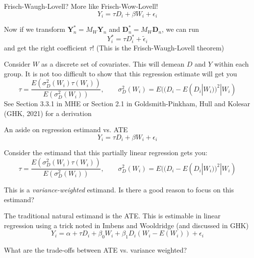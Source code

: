 \documentclass[notes,11pt, aspectratio=169]{beamer}
\newenvironment{wideitemize}{\itemize\addtolength{\itemsep}{10pt}}{\enditemize}
\begin{document}
\begin{frame}{Frisch-Waugh-Lovell? More like Frisch-Wow-Lovell!}
  $$ Y_{i} = \tau D_{i} + \beta W_{i} + \epsilon_{i}$$
  \begin{wideitemize}
  \item Now if we transform $\mathbf{Y}_{n}^{*} = M_{W}\mathbf{Y}_{n}$ and $\mathbf{D}_{n}^{*} = M_{W}\mathbf{D}_{n}$, we can run
    $$ Y_{i}^{*} = \tau D^{*}_{i} +  \tilde{\epsilon}_{i}$$
    and get the right coefficient $\tau$! (This is the Frisch-Waugh-Lovell theorem)
  \item Consider $W$ as a discrete set of covariates. This will
    demean $D$ and $Y$ within each group. It is not too difficult to
    show that this regression estimate will get you
    \begin{equation}
      \tau = \frac{E(\sigma^{2}_{D}(W_{i})\tau(W_{i}))}{E(\sigma^{2}_{D}(W_{i}))}, \qquad \sigma^{2}_{D}(W_{i}) = E((D_{i} - E(D_{i}|W_{i}))^{2} | W_{i})
    \end{equation}
    See Section 3.3.1 in MHE or Section 2.1 in Goldsmith-Pinkham, Hull
    and Kolesar (GHK, 2021) for a derivation
  \end{wideitemize}
\end{frame}

\begin{frame}{An aside on regression estimand vs. ATE}
  $$ Y_{i} = \tau D_{i} + \beta W_{i} + \epsilon_{i}$$
  \begin{wideitemize}
  \item Consider the estimand that this partially linear regression gets you:
    \begin{equation}
      \tau = \frac{E(\sigma^{2}_{D}(W_{i})\tau(W_{i}))}{E(\sigma^{2}_{D}(W_{i}))}, \qquad \sigma^{2}_{D}(W_{i}) = E((D_{i} - E(D_{i}|W_{i}))^{2} | W_{i})
    \end{equation}
  \item This is a \emph{variance-weighted} estimand. Is there a good reason to focus on this estimand?
    \pause
  \item The traditional natural estimand is the ATE. This is estimable
    in linear regression using a trick noted in Imbens and Wooldridge
    (and discussed in GHK)
    $$ Y_{i} = \alpha + \tau D_{i} + \beta_{0}W_{i} + \beta_{1} D_{i}(W_{i}-E(W_{i})) + \epsilon_{i}$$
  \item What are the trade-offs between ATE vs. variance weighted?
  \end{wideitemize}
\end{frame}
\end{document}
